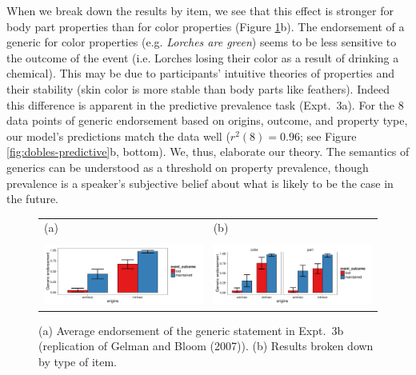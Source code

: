 \documentclass[12pt,letterpaper]{article}
\begin{document}


 
When we break down the results by item, we see that this effect is  stronger for body part properties than for color properties (Figure \ref{fig:dobles-results}b).
The endorsement of a generic for color properties (e.g. \emph{Lorches are green}) seems to be less sensitive to the outcome of the event (i.e. Lorches losing their color as a result of drinking a chemical).
This may be due to participants' intuitive theories of properties and their stability (skin color is more stable than body parts like feathers).
Indeed this difference is apparent in the predictive prevalence task (Expt.~3a).
For the 8 data points of generic endorsement based on origins, outcome, and property type, our model's predictions match the data well ($r^2(8) = 0.96$; see Figure \ref{fig:dobles-predictive}b, bottom).
We, thus, elaborate our theory.
The semantics of generics can be understood as a threshold on property prevalence, though prevalence is a speaker's subjective belief about what is likely to be the case in the future.

\begin{figure}
\begin{tabular}{l l}
(a) & (b) \\
\\
\centering
    \includegraphics[width=0.5\columnwidth]{dobles-results.pdf} &
    \includegraphics[width=0.5\columnwidth]{dobles-byItem-results.pdf} \\
\end{tabular}
    \caption{
    (a) Average endorsement of the generic statement in Expt.~3b (replication of Gelman and Bloom (2007)). (b)  Results broken down by type of item.
  }
  \label{fig:dobles-results}
\end{figure}
\end{document}
